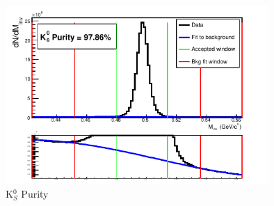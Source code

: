 \documentclass[../AnalysisNoteJBuxton.tex]{subfiles}
\begin{document}
\begin{figure}[h]
  \centering
  \includegraphics[width=100mm]{3_DataSelection/Figures/K0Purity_LamK0.pdf}
  \caption[K$^{0}_{S}$ Purity]{K$^{0}_{S}$ Purity}
  \label{fig:K0Purity}
\end{figure}
\end{document}
